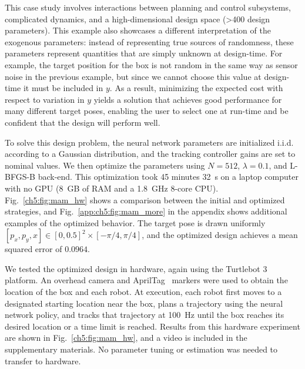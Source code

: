 This case study involves interactions between planning and control subsystems, complicated dynamics, and a high-dimensional design space (>400 design parameters). This example also showcases a different interpretation of the exogenous parameters: instead of representing true sources of randomness, these parameters represent quantities that are simply unknown at design-time. For example, the target position for the box is not random in the same way as sensor noise in the previous example, but since we cannot choose this value at design-time it must be included in $y$. As a result, minimizing the expected cost with respect to variation in $y$ yields a solution that achieves good performance for many different target poses, enabling the user to select one at run-time and be confident that the design will perform well.

To solve this design problem, the neural network parameters are initialized i.i.d. according to a Gaussian distribution, and the tracking controller gains are set to nominal values. We then optimize the parameters using $N = 512$, $\lambda = 0.1$, and L-BFGS-B back-end. This optimization took 45 minutes \SI{32}{s} on a laptop computer with no GPU (\SI{8}{GB} of RAM and a \SI{1.8}{GHz} 8-core CPU). Fig.~\ref{ch5:fig:mam_hw} shows a comparison between the initial and optimized strategies, and Fig.~\ref{app:ch5:fig:mam_more} in the appendix shows additional examples of the optimized behavior. The target pose is drawn uniformly $[p_x, p_y, x] \in[0, 0.5]^2 \times [-\pi/4, \pi/4]$, and the optimized design achieves a mean squared error of $0.0964$.

We tested the optimized design in hardware, again using the Turtlebot 3 platform. An overhead camera and AprilTag~\cite{olson2011tags} markers were used to obtain the location of the box and each robot. At execution, each robot first moves to a designated starting location near the box, plans a trajectory using the neural network policy, and tracks that trajectory at \SI{100}{Hz} until the box reaches its desired location or a time limit is reached. Results from this hardware experiment are shown in Fig.~\ref{ch5:fig:mam_hw}, and a video is included in the supplementary materials. No parameter tuning or estimation was needed to transfer to hardware.

